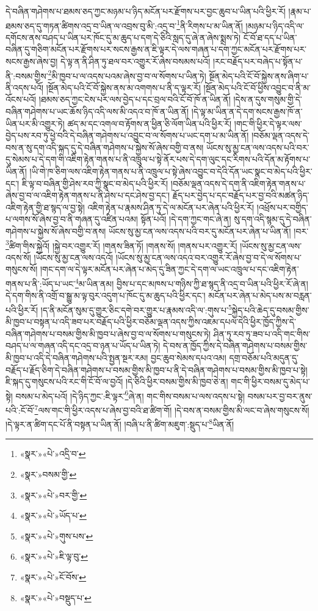 དེ་བཞིན་གཤེགས་པ་ཐམས་ཅད་ཀྱང་མཉམ་པ་ཉིད་མངོན་པར་རྫོགས་པར་བྱང་ཆུབ་པ་ཡིན་པའི་ཕྱིར་རོ། །རྣམ་པ་ཐམས་ཅད་དུ་གཏན་ཚིགས་འདྲ་བ་ཡིན་ལ་འབྲས་བུ་མི་:འདྲ་བ་\footnote{«སྣར་»«པེ་»འདྲི་བ་}ནི་རིགས་པ་མ་ཡིན་ནོ། །མཉམ་པ་ཉིད་འདི་ལ་དགོངས་ནས་བཤད་པ་ཡིན་པར་ཁོང་དུ་མ་ཆུད་པ་དག་དེ་ཅིའི་སླད་དུ་ཞེ་ན་ཞེས་སྨྲས་ཏེ། ངོ་བོ་ཐ་དད་པ་ཡིན་བཞིན་དུ་གཅིག་མངོན་པར་རྫོགས་པར་སངས་རྒྱས་ན་ཇི་ལྟར་དེ་ལས་གཞན་པ་དག་ཀྱང་མངོན་པར་རྫོགས་པར་སངས་རྒྱས་ཞེས་བྱ། དེ་ལྟ་ན་ནི་ཤིན་ཏུ་ཐལ་བར་འགྱུར་རོ་ཞེས་བསམས་པའོ། །རང་བརྗོད་པར་བཞེད་པ་སྟོན་པ་ནི་:བསམ་གྱིས་\footnote{«སྣར་»བསམ་གྱི་}མི་ཁྱབ་པ་ལ་འདས་པའམ་ཞེས་བྱ་བ་ལ་སོགས་པ་ཡིན་ཏེ། སྔོན་མེད་པའི་ངོ་བོ་སྐྱེས་ནས་ཞིག་པ་ནི་འདས་པའོ། །སྔོན་མེད་པའི་ངོ་བོ་སྐྱེས་ནས་མ་འགགས་པ་ནི་ད་ལྟར་རོ། །སྔོན་མེད་པའི་ངོ་བོ་ཕྱིས་འབྱུང་བ་ནི་མ་འོངས་པའོ། །ཐམས་ཅད་ཀྱང་ངེས་པར་ལས་བྱེད་པ་དང་བྲལ་བའི་ངོ་བོ་ཁོ་ན་ཡིན་ནོ། །དེས་ན་དུས་གསུམ་གྱི་དེ་བཞིན་གཤེགས་པ་ཡང་ཆོས་ཉིད་འདི་ལས་མི་འདའ་བ་ཁོ་ན་ཡིན་ནོ། །དེ་ལྟ་མ་ཡིན་ན་དེ་དག་སངས་རྒྱས་ཁོ་ན་ཡིན་པར་མི་འགྱུར་ཏེ། ཚད་མ་དང་འགལ་བ་རྟོགས་ན་ཕྱིན་ཅི་ལོག་ཡིན་པའི་ཕྱིར་རོ། །གང་གི་ཕྱིར་དེ་ལྟར་ལས་བྱེད་པས་རབ་ཏུ་ཕྱེ་བའི་དེ་བཞིན་གཤེགས་པ་འབྱུང་བ་ལ་སོགས་པ་ཡང་དག་པ་མ་ཡིན་ནོ། །བཅོམ་ལྡན་འདས་དེ་བས་ན་སུ་དག་འདི་སྐད་དུ་དེ་བཞིན་གཤེགས་པ་སྐྱེས་སོ་ཞེས་བགྱི་བ་ནས། ཡོངས་སུ་མྱ་ངན་ལས་འདས་པའི་བར་དུ་སེམས་པ་དེ་དག་གི་འཇིག་རྟེན་གནས་པ་ནི་འཁྲུལ་པ་སྟེ་ནོར་པས་དེ་དག་ལུང་དང་རིགས་པའི་དོན་མ་རྟོགས་པ་ཡིན་ནོ། །ཡི་གེ་ཁ་ཅིག་ལས་འཇིག་རྟེན་གནས་པ་ནི་འཁྲུལ་པ་སྟེ་ཞེས་འབྱུང་བ་དེའི་དོན་ཡང་སྣང་བ་མེད་པའི་ཕྱིར་དང་། ཇི་ལྟ་བ་བཞིན་གྱི་ཤེས་རབ་ཀྱི་སྣང་བ་མེད་པའི་ཕྱིར་རོ། །བཅོམ་ལྡན་འདས་དེ་དག་ནི་འཇིག་རྟེན་གནས་པ་ཞེས་བྱ་བ་ལ་འཇིག་རྟེན་གནས་པ་ནི་ཤེས་པ་དང་ཤེས་བྱ་དང་། རྗོད་པར་བྱེད་པ་དང་བརྗོད་པར་བྱ་བའི་མཚན་ཉིད་འཇིག་རྟེན་གྱི་ཐ་སྙད་ལ་བྱ་སྟེ། འཇིག་རྟེན་པ་རྣམས་ཤིན་ཏུ་དེ་ལ་མངོན་པར་ཞེན་པའི་ཕྱིར་རོ། །འཕྲོས་པར་བགྱིད་པ་ལགས་སོ་ཞེས་བྱ་བ་ནི་གཞན་དུ་འཛིན་པའམ། སྟོན་པའོ། །དེ་དག་ཀྱང་གང་ཞེ་ན། སུ་དག་འདི་སྙམ་དུ་དེ་བཞིན་གཤེགས་པ་སྐྱེས་སོ་ཞེས་བགྱི་བ་ནས། ཡོངས་སུ་མྱ་ངན་ལས་འདས་པའི་བར་དུ་མངོན་པར་ཞེན་པ་ཡིན་ནོ། །བར་\footnote{«སྣར་»«པེ་»བར་གྱི་}ཚིག་གིས་སྐྱེའོ། །སྐྱེ་བར་འགྱུར་རོ། །གནས་ཟིན་ཏོ། །གནས་སོ། །གནས་པར་འགྱུར་རོ། །ཡོངས་སུ་མྱ་ངན་ལས་འདས་སོ། །ཡོངས་སུ་མྱ་ངན་ལས་འདའོ། །ཡོངས་སུ་མྱ་ངན་ལས་འདའ་བར་འགྱུར་རོ་ཞེས་བྱ་བ་དེ་ལ་སོགས་པ་གསུངས་སོ། །གང་དག་ལ་དེ་ལྟར་མངོན་པར་ཞེན་པ་མེད་དུ་ཟིན་ཀྱང་དེ་དག་ལ་ཡང་འཁྲུལ་པ་དང་འཇིག་རྟེན་གནས་པ་ནི་:ཡོད་པ་ཡང་\footnote{«སྣར་»«པེ་»ཡོད་པ་}མ་ཡིན་ནམ། བྱིས་པ་དང་མཁས་པ་གཉིས་ཀྱི་ཐ་སྙད་ནི་འདྲ་བ་ཡིན་པའི་ཕྱིར་རོ་ཞེ་ན། དེ་དག་གིས་ནི་འགྲོ་བ་སྒྱུ་མ་ལྟ་བུར་འདུག་པ་ཁོང་དུ་མ་ཆུད་པའི་ཕྱིར་དང་། མངོན་པར་ཞེན་པ་མེད་པས་མ་བརླན་པའི་ཕྱིར་རོ། །ད་ནི་མངོན་སུམ་དུ་གྱུར་ཅིང་དགེ་བར་གྱུར་པ་རྣམས་འདི་ལ་:གུས་པ་\footnote{«སྣར་»«པེ་»གུས་པས་}སྐྱེད་པའི་ཆེད་དུ་བསམ་གྱིས་མི་ཁྱབ་པ་བསྟན་པ་འདི་ཟབ་པར་བརྗོད་པའི་ཕྱིར་བཅོམ་ལྡན་འདས་ཀྱིས་འཇམ་དཔལ་དེའི་ཕྱིར་ཁྱོད་ཀྱིས་དེ་བཞིན་གཤེགས་པ་བསམ་གྱིས་མི་ཁྱབ་པ་ཞེས་བྱ་བ་ལ་སོགས་པ་གསུངས་ཏེ། ཤིན་ཏུ་རབ་ཏུ་ཟབ་པ་འདི་གང་གིས་བཤད་པ་ལ་གཞན་འདི་དང་འདྲ་བ་ཉན་པ་ཡོད་པ་ཡིན་ཏེ། དེ་བས་ན་ཁྱོད་ཀྱིས་དེ་བཞིན་གཤེགས་པ་བསམ་གྱིས་མི་ཁྱབ་པ་འདི་དེ་བཞིན་གཤེགས་པའི་སྤྱན་སྔར་རམ། བྱང་ཆུབ་སེམས་དཔའ་འམ། དགྲ་བཅོམ་པའི་མདུན་དུ་བརྗོད་པ་རྗོད་ཅིག་དེ་བཞིན་གཤེགས་པ་བསམ་གྱིས་མི་ཁྱབ་པ་ནི་དེ་བཞིན་གཤེགས་པ་བསམ་གྱིས་མི་ཁྱབ་པ་སྟེ། ཇི་སྐད་དུ་གསུངས་པའི་རང་གི་ངོ་བོ་ལ་བྱའོ། །དེ་ཅིའི་ཕྱིར་བསམ་གྱིས་མི་ཁྱབ་ཅེ་ན། གང་གི་ཕྱིར་བསམ་དུ་མེད་པ་སྟེ། བསམ་པ་མེད་པའོ། །དེ་ཉིད་ཀྱང་:ཇི་ལྟར་\footnote{«སྣར་»«པེ་»ཇི་ལྟ་བུ་}ཞེ་ན། གང་གིས་བསམ་པ་ལས་འདས་པ་སྟེ། བསམ་པར་བྱ་བར་ནུས་པའི་:ངོ་བོ་\footnote{«སྣར་»«པེ་»ངོ་བོས་}ལས་གང་གི་ཕྱིར་འདས་པ་ཞེས་བྱ་བའི་ཐ་ཚིག་གོ། །དེ་བས་ན་བསམ་གྱིས་མི་ལང་བ་ཞེས་གསུངས་སོ། །དེ་ལྟར་ན་ཚིག་དང་པོ་ནི་བསྟན་པ་ཡིན་ནོ། །བཞི་པ་ནི་ཚིག་མཇུག་:སྡུད་པ་\footnote{«སྣར་»«པེ་»བསྡུད་པ་}ཡིན་ནོ། 